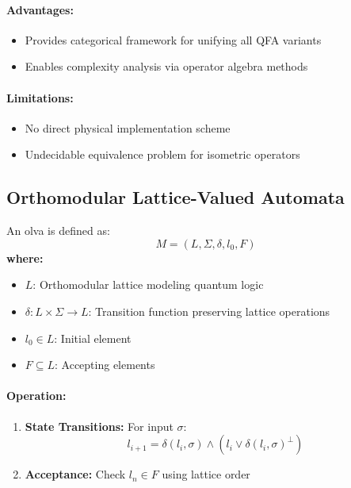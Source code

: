 \paragraph{Advantages:}
\begin{itemize}
    \item Provides categorical framework for unifying all QFA variants
    \item Enables complexity analysis via operator algebra methods
\end{itemize}

\paragraph{Limitations:}
\begin{itemize}
    \item No direct physical implementation scheme
    \item Undecidable equivalence problem for isometric operators
\end{itemize}

\subsection{Orthomodular Lattice-Valued Automata}
\label{subsec:olva}

\begin{definition}
An \gls{olva} is defined as:
\[
M = (L, \Sigma, \delta, l_0, F)
\]
\textbf{where:}
\begin{itemize}
    \item $L$: Orthomodular lattice modeling quantum logic
    \item $\delta: L \times \Sigma \rightarrow L$: Transition function preserving lattice operations
    \item $l_0 \in L$: Initial element
    \item $F \subseteq L$: Accepting elements
\end{itemize}
\end{definition}

\paragraph{Operation:}
\begin{enumerate}
    \item \textbf{State Transitions:} For input $\sigma$:
\[
l_{i+1} = \delta(l_i, \sigma) \land (l_i \lor \delta(l_i, \sigma)^\perp)
\]
    \item \textbf{Acceptance:} Check $l_n \in F$ using lattice order
\end{enumerate}

